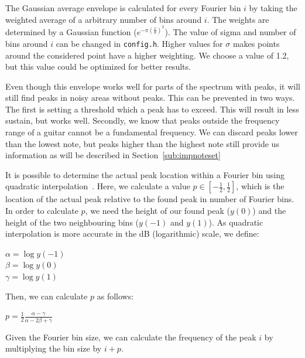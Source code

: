\documentclass[10pt,twocolumn]{article}
\begin{document}
The Gaussian average envelope is calculated for every Fourier bin $i$ by taking the weighted average of a arbitrary number of bins around $i$. The weights are determined by a Gaussian function ($e^{-\pi(\frac{x}{\sigma})^2}$). The value of sigma and number of bins around $i$ can be changed in \texttt{config.h}. Higher values for $\sigma$ makes points around the considered point have a higher weighting. We choose a value of 1.2, but this value could be optimized for better results.

Even though this envelope works well for parts of the spectrum with peaks, it will still find peaks in noisy areas without peaks. This can be prevented in two ways. The first is setting a threshold which a peak has to exceed. This will result in less sustain, but works well. Secondly, we know that peaks outside the frequency range of a guitar cannot be a fundamental frequency. We can discard peaks lower than the lowest note, but peaks higher than the highest note still provide us information as will be described in Section~\ref{sub:impnoteset}

It is possible to determine the actual peak location within a Fourier bin using quadratic interpolation~\cite{interpol2}. Here, we calculate a value $p \in [-\frac{1}{2}, \frac{1}{2}]$, which is the location of the actual peak relative to the found peak in number of Fourier bins. In order to calculate $p$, we need the height of our found peak ($y(0)$) and the height of the two neighbouring bins ($y(-1)$ and $y(1)$). As quadratic interpolation is more accurate in the dB (logarithmic) scale, we define:
\begin{center}\vspace{-1mm}
    $\alpha = \log y(-1)$\\
    $\beta = \log y(0)$\\
    $\gamma = \log y(1)$
\end{center}\vspace{-1mm}
Then, we can calculate $p$ as follows:
\begin{center}\vspace{-1mm}
    $p = \frac{1}{2} \frac{\alpha - \gamma}{\alpha - 2\beta + \gamma}$
\end{center}\vspace{-1mm}
Given the Fourier bin size, we can calculate the frequency of the peak $i$ by multiplying the bin size by $i + p$.
\end{document}
